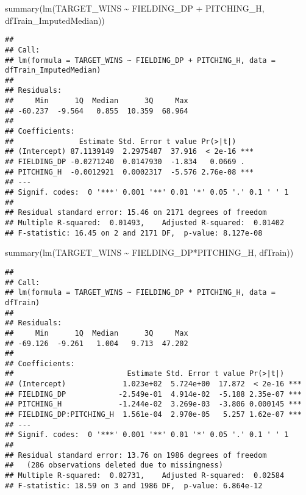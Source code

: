 \documentclass[
]{article}
\newenvironment{Shaded}{\begin{snugshade}}{\end{snugshade}}
\newcommand{\FunctionTok}[1]{\textcolor[rgb]{0.00,0.00,0.00}{#1}}
\newcommand{\NormalTok}[1]{#1}
\newcommand{\SpecialCharTok}[1]{\textcolor[rgb]{0.00,0.00,0.00}{#1}}
\begin{document}
\begin{Shaded}
\begin{Highlighting}[]
\FunctionTok{summary}\NormalTok{(}\FunctionTok{lm}\NormalTok{(TARGET\_WINS }\SpecialCharTok{\textasciitilde{}}\NormalTok{ FIELDING\_DP }\SpecialCharTok{+}\NormalTok{ PITCHING\_H, dfTrain\_ImputedMedian))}
\end{Highlighting}
\end{Shaded}

\begin{verbatim}
## 
## Call:
## lm(formula = TARGET_WINS ~ FIELDING_DP + PITCHING_H, data = dfTrain_ImputedMedian)
## 
## Residuals:
##     Min      1Q  Median      3Q     Max 
## -60.237  -9.564   0.855  10.359  68.964 
## 
## Coefficients:
##               Estimate Std. Error t value Pr(>|t|)    
## (Intercept) 87.1139149  2.2975487  37.916  < 2e-16 ***
## FIELDING_DP -0.0271240  0.0147930  -1.834   0.0669 .  
## PITCHING_H  -0.0012921  0.0002317  -5.576 2.76e-08 ***
## ---
## Signif. codes:  0 '***' 0.001 '**' 0.01 '*' 0.05 '.' 0.1 ' ' 1
## 
## Residual standard error: 15.46 on 2171 degrees of freedom
## Multiple R-squared:  0.01493,    Adjusted R-squared:  0.01402 
## F-statistic: 16.45 on 2 and 2171 DF,  p-value: 8.127e-08
\end{verbatim}

\begin{Shaded}
\begin{Highlighting}[]
\FunctionTok{summary}\NormalTok{(}\FunctionTok{lm}\NormalTok{(TARGET\_WINS }\SpecialCharTok{\textasciitilde{}}\NormalTok{ FIELDING\_DP}\SpecialCharTok{*}\NormalTok{PITCHING\_H, dfTrain))}
\end{Highlighting}
\end{Shaded}

\begin{verbatim}
## 
## Call:
## lm(formula = TARGET_WINS ~ FIELDING_DP * PITCHING_H, data = dfTrain)
## 
## Residuals:
##     Min      1Q  Median      3Q     Max 
## -69.126  -9.261   1.004   9.713  47.202 
## 
## Coefficients:
##                          Estimate Std. Error t value Pr(>|t|)    
## (Intercept)             1.023e+02  5.724e+00  17.872  < 2e-16 ***
## FIELDING_DP            -2.549e-01  4.914e-02  -5.188 2.35e-07 ***
## PITCHING_H             -1.244e-02  3.269e-03  -3.806 0.000145 ***
## FIELDING_DP:PITCHING_H  1.561e-04  2.970e-05   5.257 1.62e-07 ***
## ---
## Signif. codes:  0 '***' 0.001 '**' 0.01 '*' 0.05 '.' 0.1 ' ' 1
## 
## Residual standard error: 13.76 on 1986 degrees of freedom
##   (286 observations deleted due to missingness)
## Multiple R-squared:  0.02731,    Adjusted R-squared:  0.02584 
## F-statistic: 18.59 on 3 and 1986 DF,  p-value: 6.864e-12
\end{verbatim}
\end{document}
